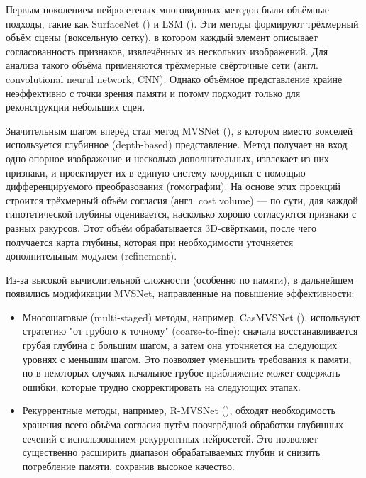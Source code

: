 Первым поколением нейросетевых многовидовых методов были объёмные подходы, такие
как SurfaceNet (\cite{ji2017surfacenet}) и LSM
(\cite{kar2017learningmultiviewstereomachine}). Эти методы формируют трёхмерный
объём сцены (воксельную сетку), в котором каждый элемент описывает
согласованность признаков, извлечённых из нескольких изображений. Для анализа
такого объёма применяются трёхмерные свёрточные сети (англ. convolutional neural
network, CNN). Однако объёмное представление крайне неэффективно с точки зрения
памяти и потому подходит только для реконструкции небольших сцен.

Значительным шагом вперёд стал метод MVSNet
(\cite{yao2018mvsnetdepthinferenceunstructured}), в котором вместо вокселей
используется глубинное (depth-based) представление. Метод получает на вход одно
опорное изображение и несколько дополнительных, извлекает из них признаки, и
проектирует их в единую систему координат с помощью дифференцируемого
преобразования (гомографии). На основе этих проекций строится трёхмерный
объём согласия (англ. cost volume) — по сути, для каждой гипотетической глубины
оценивается, насколько хорошо согласуются признаки с разных ракурсов. Этот объём
обрабатывается 3D-свёртками, после чего получается карта глубины, которая при
необходимости уточняется дополнительным модулем (refinement).

Из-за высокой вычислительной сложности (особенно по памяти), в дальнейшем
появились модификации MVSNet, направленные на повышение эффективности:

\begin{itemize}
	\item Многошаговые (multi-staged) методы, например, CasMVSNet
	(\cite{gu2020cascadecostvolumehighresolution}), используют стратегию "от
	грубого к точному" (coarse-to-fine): сначала восстанавливается грубая глубина
	с большим шагом, а затем она уточняется на следующих уровнях с меньшим шагом.
	Это позволяет уменьшить требования к памяти, но в некоторых случаях начальное
	грубое приближение может содержать ошибки, которые трудно скорректировать на
	следующих этапах.
	\item Рекуррентные методы, например, R-MVSNet
	(\cite{yao2019recurrentmvsnethighresolutionmultiview}), обходят необходимость
	хранения всего объёма согласия путём поочерёдной обработки глубинных сечений с
	использованием рекуррентных нейросетей. Это позволяет существенно расширить
	диапазон обрабатываемых глубин и снизить потребление памяти, сохранив высокое
	качество.
\end{itemize}

